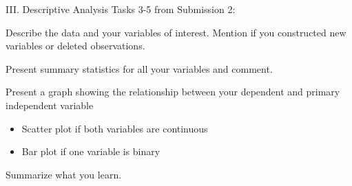\documentclass{./../Lectures/div_teaching_slides}
\begin{document}

\begin{frame}{III. Descriptive Analysis}
Tasks 3-5 from Submission 2: \\ \vspace{0.25em}
\begin{wenumerate}
  \item Describe the data and your variables of interest. Mention if you constructed new variables or deleted observations.  
  \item Present summary statistics for all your variables and comment.
  \item Present a graph showing the relationship between your dependent and primary independent variable \\
  \begin{itemize}
  \item Scatter plot if both variables are continuous
  \item Bar plot if one variable is binary
\end{itemize}
Summarize what you learn. 
\end{wenumerate}
\end{frame}
\end{document}
